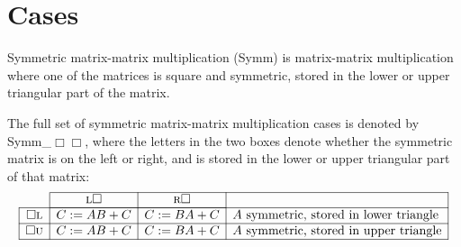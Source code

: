 \chapter{Cases}
Symmetric matrix-matrix multiplication ({\sc Symm}) 
is matrix-matrix multiplication where one of the matrices is square and symmetric, stored in the lower or upper triangular part of the matrix.  

The full set of 
symmetric matrix-matrix multiplication cases 
is denoted by {\sc Symm\_$\Box \Box $}, 
where the letters in the two boxes denote whether the 
symmetric matrix is on the {\sc l}eft or {\sc r}ight, 
and is stored in the 
{\sc l}ower or {\sc u}pper triangular part of that matrix:
\[
\begin{array}{c |  c   |   c  | l |} \cline{2-4}
&  {\mbox{\sc l} \Box  }
&  {\mbox{\sc r} \Box  } 
&
\\ \cline{2-3}
\hline
\multicolumn{1}{|c |}{ \Box \mbox{\sc l}} & C := A B + C &
C := B A + C 
& \mbox{$ A $ symmetric, stored in lower triangle}\\
\hline
\multicolumn{1}{|c |}{ \Box \mbox{\sc u}} & C := A B + C &
C := B A + C 
& \mbox{$ A $ symmetric, stored in upper triangle}\\
\hline
\end{array}
\]
